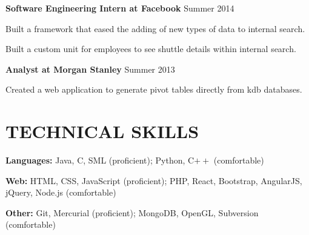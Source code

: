 \documentclass[margin, 11pt]{res} %
\begin{document}
\begin{resume}
\vspace{3pt}

{\bf Software Engineering Intern at Facebook} \hfill {\small Summer 2014}

\begin{itemize} \itemsep -2pt
{\small
\item Built a framework that eased the adding of new types of data to internal search.
\item Built a custom unit for employees to see shuttle details within internal search.
}
\end{itemize}

\vspace{3pt}

{\bf Analyst at Morgan Stanley} \hfill {\small Summer 2013}
\begin{itemize} \itemsep -2pt %
{\small
\item Created a web application to generate pivot tables directly from kdb databases.
}
\end{itemize}


\section{TECHNICAL SKILLS}

{\bf Languages:}
Java, C, SML (proficient); Python, C$++$ (comfortable)

\vspace{5pt}

{\bf Web:}
HTML, CSS, JavaScript (proficient); PHP, React, Bootstrap, AngularJS, jQuery, Node.js (comfortable)

\vspace{5pt}

{\bf Other:}
Git, Mercurial (proficient); MongoDB, OpenGL, Subversion (comfortable)



\end{resume}
\end{document}
